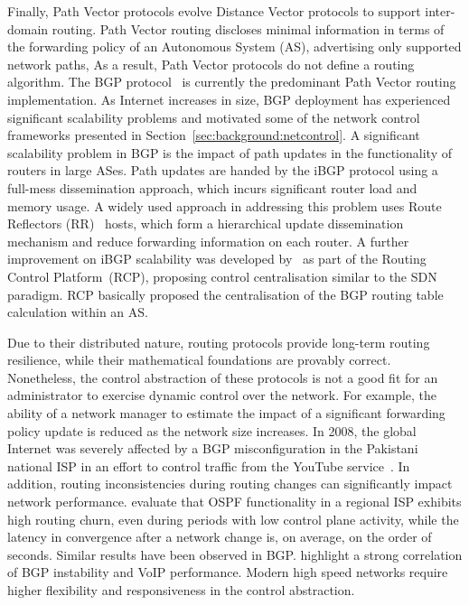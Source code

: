 Finally, Path Vector protocols evolve Distance Vector protocols to support
inter-domain routing. Path Vector routing discloses minimal information in terms
of the forwarding policy of an Autonomous System (AS), advertising only supported network paths, As
a result, Path Vector protocols do not define a routing algorithm.  The BGP
protocol~ is currently the predominant Path Vector routing
implementation.  As Internet increases in size, BGP deployment has experienced
significant scalability problems and motivated some of the network control
frameworks presented in Section~\ref{sec:background:netcontrol}.  A significant
scalability problem in BGP is the impact of path updates in the functionality of
routers in large ASes. Path updates are handed by the iBGP protocol using a
full-mess dissemination approach, which incurs significant router load and
memory usage. A widely used approach in addressing this problem uses Route
Reflectors (RR)~ hosts, which form a hierarchical update
dissemination mechanism and reduce forwarding information on each router. A
further improvement on iBGP scalability was developed by~ as
part of the Routing Control Platform~(RCP), proposing control centralisation
similar to the SDN paradigm. RCP basically proposed the centralisation of
the BGP routing table calculation within an AS.

Due to their distributed nature, routing protocols provide long-term routing
resilience, while their mathematical foundations are provably correct.
Nonetheless, the control abstraction of these protocols is not a good fit for
an administrator to exercise dynamic control over the network. For example, the
ability of a network manager to estimate the impact of a significant forwarding
policy update is reduced as the network size increases.  In 2008, the global
Internet was severely affected by a BGP misconfiguration in the Pakistani
national ISP in an effort to control traffic from the YouTube
service~.  In addition, routing inconsistencies during
routing changes can significantly impact network performance.
 evaluate that OSPF functionality in a regional ISP exhibits
high routing churn, even during periods with low control plane activity, while
the latency in convergence after a network change is, on average, on the order of
seconds. Similar results have been observed in BGP\@.  
highlight a strong correlation of BGP instability and VoIP
performance. Modern high speed networks require higher flexibility and
responsiveness in the control abstraction. 

